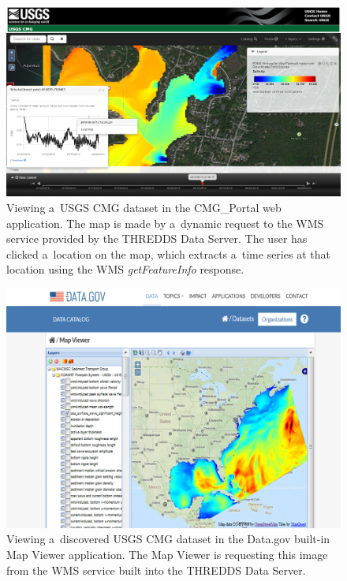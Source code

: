 \documentclass[osd, online, hvmath]{copernicus}
\begin{document}
\begin{figure}
\includegraphics[width=145mm]{os-2015-64-discussions-f09.png}
\caption{Viewing a~USGS CMG dataset in the CMG\_Portal web
  application. The map is made by a~dynamic request to the WMS service
  provided by the THREDDS Data Server. The user has clicked a~location
  on the map, which extracts a~time series at that location using the
  WMS \textit{getFeatureInfo} response. }
\label{osd-2015-0064-f09.pdf}
\end{figure}

\begin{figure}
\includegraphics[width=140mm]{os-2015-64-discussions-f10.png}
\caption{Viewing a~discovered USGS CMG dataset in the Data.gov
  built-in Map Viewer application. The Map Viewer is requesting this
  image from the WMS service built into the THREDDS Data Server. }
\label{osd-2015-0064-f10.pdf}
\end{figure}
\end{document}
